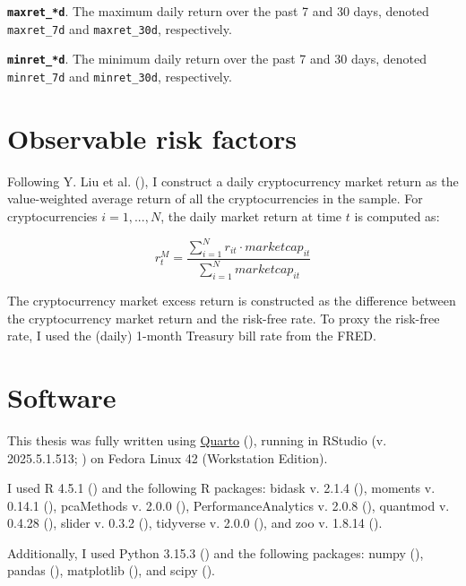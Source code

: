 \documentclass[
  12pt,
  a4paper,
  openany]{scrbook}
\begin{document}
\textbf{\texttt{maxret\_*d}}. The maximum daily return over the past 7
and 30 days, denoted \texttt{maxret\_7d} and \texttt{maxret\_30d},
respectively.

\textbf{\texttt{minret\_*d}}. The minimum daily return over the past 7
and 30 days, denoted \texttt{minret\_7d} and \texttt{minret\_30d},
respectively.

\section{Observable risk factors}\label{sec-obs_factors}

Following Y. Liu et al. (), I
construct a daily cryptocurrency market return as the value-weighted
average return of all the cryptocurrencies in the sample. For
cryptocurrencies \(i = 1, ..., N\), the daily market return at time
\(t\) is computed as:

\[
r_t^M = \frac{\sum_{i=1}^N r_{it} \cdot marketcap_{it}}
             {\sum_{i=1}^N marketcap_{it} }
\]

The cryptocurrency market excess return is constructed as the difference
between the cryptocurrency market return and the risk-free rate. To
proxy the risk-free rate, I used the (daily) 1-month Treasury bill rate
from the FRED.

\section{Software}\label{sec-software}

This thesis was fully written using \href{https://quarto.org/}{Quarto}
(), running in RStudio
(v. 2025.5.1.513; ) on Fedora
Linux 42 (Workstation Edition).

I used R 4.5.1 () and the
following R packages: bidask v. 2.1.4 (), moments v. 0.14.1 (), pcaMethods v. 2.0.0
(),
PerformanceAnalytics v. 2.0.8
(), quantmod
v. 0.4.28 (), slider v.
0.3.2 (), tidyverse v. 2.0.0
(), and zoo v. 1.8.14
().

Additionally, I used Python 3.15.3 () and the following packages: numpy
(), pandas
(),
matplotlib (), and scipy
().


\backmatter
\end{document}
